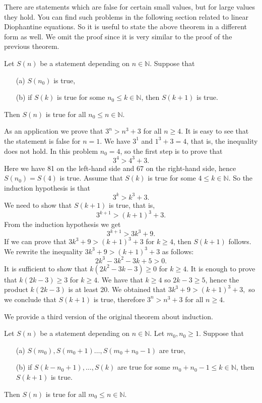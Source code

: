 There are statements which are false for certain small values, but for large values they hold. You can find such problems in the following section
related to linear Diophantine equations. So it is useful to state the above theorem in a different form as well. We omit the proof since it is very similar
to the proof of the previous theorem.
\begin{theorem}
Let $S(n)$ be a statement depending on $n\in\mathbb{N}$. Suppose that 
\begin{enumerate}
\item[(a)] $S(n_0)$ is true,
\item[(b)] if $S(k)$ is true for some $n_0\leq k\in\mathbb{N}$, then $S(k+1)$ is true.
\end{enumerate}
Then $S(n)$ is true for all $n_0\leq n\in\mathbb{N}$.
\end{theorem}
As an application we prove that $3^n>n^3+3$ for all $n\geq 4$. It is easy to see that the statement is false for $n=1$.
We have $3^1$ and $1^3+3=4$, that is, the inequality does not hold. In this problem $n_0=4$, so the first step is to prove that
$$
3^4>4^3+3.
$$
Here we have 81 on the left-hand side and 67 on the right-hand side, hence $S(n_0)=S(4)$ is true. Assume that $S(k)$ is true for some
$4\leq k\in\mathbb{N}$. So the induction hypothesis is that
$$
3^k>k^3+3.
$$
We need to show that $S(k+1)$ is true, that is, 
$$
3^{k+1}>(k+1)^3+3.
$$
From the induction hypothesis we get
$$
3^{k+1}>3k^3+9.
$$
If we can prove that $3k^3+9>(k+1)^3+3$ for $k\geq 4$, then $S(k+1)$ follows. We rewrite the inequality $3k^3+9>(k+1)^3+3$ as follows:
$$
2k^3-3k^2-3k+5>0.
$$
It is sufficient to show that $k(2k^2-3k-3)\geq 0$ for $k\geq 4$. It is enough to prove that $k(2k-3)\geq 3$ for $k\geq 4$.
We have that $k\geq 4$ so $2k-3\geq 5$, hence the product $k(2k-3)$ is at least 20. We obtained that $3k^3+9>(k+1)^3+3,$ so we conclude that
$S(k+1)$ is true, therefore $3^n>n^3+3$ for all $n\geq 4$.

We provide a third version of the original theorem about induction.
\begin{theorem}
Let $S(n)$ be a statement depending on $n\in\mathbb{N}$.  Let $m_0 , n_0\geq 1.$ Suppose that 
\begin{enumerate}
\item[(a)] $S(m_0),S(m_0+1)\ldots,S(m_0+n_0-1)$ are true,
\item[(b)] if $S(k-n_0+1),\ldots,S(k)$ are true for some $m_0+n_0-1\leq k\in\mathbb{N}$, then $S(k+1)$ is true.
\end{enumerate}
Then $S(n)$ is true for all $m_0\leq n\in\mathbb{N}$.
\end{theorem}

